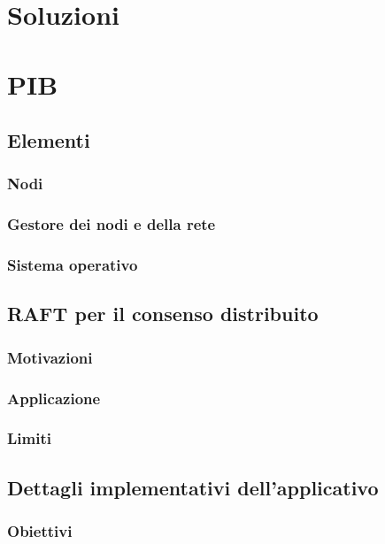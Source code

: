 \documentclass[acmtog]{acmart}
\begin{document}
\section{Soluzioni}

\section{PIB}
\subsection{Elementi}
\subsubsection{Nodi}

\subsubsection{Gestore dei nodi e della rete}

\subsubsection{Sistema operativo}

\subsection{RAFT per il consenso distribuito}
\subsubsection{Motivazioni}

\subsubsection{Applicazione}

\subsubsection{Limiti}

\subsection{Dettagli implementativi dell'applicativo}
\subsubsection{Obiettivi}
\end{document}
